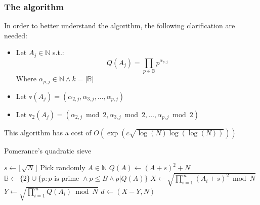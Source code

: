 \subsubsection{The algorithm}
In order to better understand the algorithm, the following clarification are needed:
\begin{itemize}
    \item Let $A_{j} \in \mathbb{N}$ s.t.:
    \[
    Q(A_{j}) = \prod_{p \in \mathbb{B}}p^{\alpha_{p,j}}
    \]
    Where $\alpha_{p,j} \in \mathbb{N} \land k = |\mathbb{B}|$
    \item Let $\mathbb{v}(A_{j}) = (\alpha_{2,j}, \alpha_{3,j}, \dots, \alpha_{p,j})$
    \item Let $\mathbb{v}_{2}(A_{j}) = (\alpha_{2,j} \bmod 2, \alpha_{3,j} \bmod 2, \dots, \alpha_{p,j} \bmod 2)$
\end{itemize}
This algorithm has a cost of $O(\operatorname{exp}(c \sqrt{\operatorname{log}(N)\operatorname{log}(\operatorname{log}(N))}))$

\begin{algorithm}
\caption{Pomerance's quadratic sieve}\label{alg:pomerance_sieve}
$s \gets \lfloor \sqrt{N} \rfloor$\;
Pick randomly $A \in \mathbb{N}$\;
$Q(A) \gets (A + s)^{2} + N$\;
$\mathbb{B} \gets \{2\} \cup \{p: p \text{ is prime } \land p \leq B \land p | Q(A)\}$\;
$X \gets \sqrt{\prod_{i=1}^{m}(A_{i} + s)^{2} \bmod N}$\;
$Y \gets \sqrt{\prod_{i=1}^{m} Q(A_{i}) \bmod N}$\;
$d \gets (X - Y, N)$\;
\end{algorithm}
